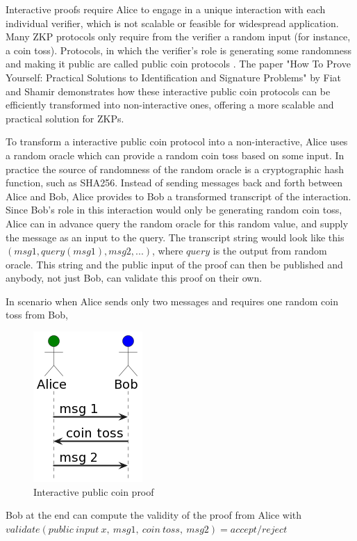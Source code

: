 Interactive proofs require Alice to engage in a unique interaction with each
individual verifier, which is not scalable or feasible for widespread
application. Many ZKP protocols only require from the verifier a random input
(for instance, a coin toss). Protocols, in which the verifier's role is
generating some randomness and making it public are called public coin protocols \cite{Babai1988,Goldwasser1986}.
The paper "How To Prove Yourself: Practical Solutions to Identification and
Signature Problems"\cite{Fiat} by Fiat and Shamir demonstrates how these
interactive public coin protocols can be efficiently transformed into
non-interactive ones, offering a more scalable and practical solution for ZKPs.

To transform a interactive public coin protocol into a non-interactive,
Alice uses a random oracle which can provide a random coin toss based on some
input. In practice the source of randomness of the random oracle is a
cryptographic hash function, such as SHA256. Instead of sending messages back
and forth between Alice and Bob, Alice provides to Bob a transformed
transcript of the interaction. Since Bob's role in this interaction would only
be generating random coin toss, Alice can in advance query the random oracle
for this random value, and supply the message as an input to the query. The
transcript string would look like this $(msg1, query(msg1), msg2, ...)$, where $query$ is
the output from random oracle. This string and the public input of the proof
can then be published and anybody, not just Bob, can validate this proof
on their own.

In scenario when Alice sends only two messages and requires one random coin toss
from Bob,
\begin{figure}[h]
    \centering
    \includegraphics[scale=0.6]{assets/images/interactive_coin.png}
    \caption{Interactive public coin proof}
    \label{fig:interactive_coin}
    \vspace{0.5cm}
\end{figure}
Bob at the end can compute the validity of the proof from Alice with
$validate(public\:input\:x,\:msg1,\:coin\:toss,\:msg2) = accept/reject$

